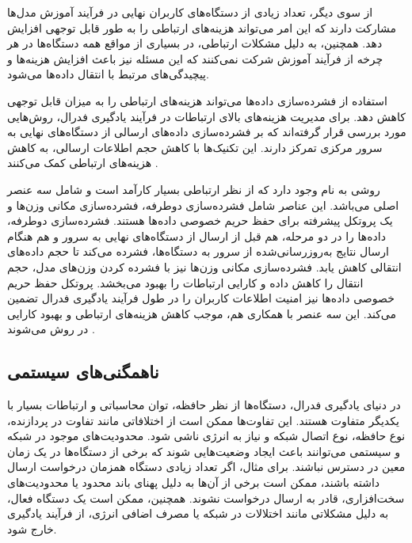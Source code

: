 از سوی دیگر، تعداد زیادی از دستگاه‌های کاربران نهایی در فرآیند آموزش مدل‌ها مشارکت دارند که این امر می‌تواند هزینه‌های ارتباطی را به طور قابل توجهی افزایش دهد. همچنین، به دلیل مشکلات ارتباطی، در بسیاری از مواقع همه دستگاه‌ها در هر چرخه از فرآیند آموزش شرکت نمی‌کنند که این مسئله نیز باعث افزایش هزینه‌ها و پیچیدگی‌های مرتبط با انتقال داده‌ها می‌شود.


استفاده از فشرده‌سازی داده‌ها می‌تواند هزینه‌های ارتباطی را به میزان قابل توجهی کاهش دهد. برای مدیریت هزینه‌های بالای ارتباطات در فرآیند یادگیری فدرال، روش‌هایی مورد بررسی قرار گرفته‌اند که بر فشرده‌سازی داده‌های ارسالی از دستگاه‌های نهایی به سرور مرکزی تمرکز دارند. این تکنیک‌ها با کاهش حجم اطلاعات ارسالی، به کاهش هزینه‌های ارتباطی کمک می‌کنند
\cite{konevcny2016federated}.

روشی به نام
%
وجود دارد که از نظر ارتباطی بسیار کارآمد است و شامل سه عنصر اصلی می‌باشد. این عناصر شامل فشرده‌سازی دوطرفه، فشرده‌سازی مکانی وزن‌ها و یک پروتکل پیشرفته برای حفظ حریم خصوصی داده‌ها هستند. فشرده‌سازی دوطرفه، داده‌ها را در دو مرحله، هم قبل از ارسال از دستگاه‌های نهایی به سرور و هم هنگام ارسال نتایج به‌روزرسانی‌شده از سرور به دستگاه‌ها، فشرده می‌کند تا حجم داده‌های انتقالی کاهش یابد. فشرده‌سازی مکانی وزن‌ها نیز با فشرده کردن وزن‌های مدل، حجم انتقال را کاهش داده و کارایی ارتباطات را بهبود می‌بخشد. پروتکل حفظ حریم خصوصی داده‌ها نیز امنیت اطلاعات کاربران را در طول فرآیند یادگیری فدرال تضمین می‌کند. این سه عنصر با همکاری هم، موجب کاهش هزینه‌های ارتباطی و بهبود کارایی در روش
می‌شوند
\cite{fang2021privacy}.



\subsection{
	ناهمگنی‌های سیستمی%
}
در دنیای یادگیری فدرال، دستگاه‌ها از نظر حافظه، توان محاسباتی و ارتباطات بسیار با یکدیگر متفاوت هستند. این تفاوت‌ها ممکن است از اختلافاتی مانند تفاوت در پردازنده، نوع حافظه، نوع اتصال شبکه و نیاز به انرژی ناشی شود. محدودیت‌های موجود در شبکه و سیستمی می‌توانند باعث ایجاد وضعیت‌هایی شوند که برخی از دستگاه‌ها در یک زمان معین در دسترس نباشند. برای مثال، اگر تعداد زیادی دستگاه همزمان درخواست ارسال داشته باشند، ممکن است برخی از آن‌ها به دلیل پهنای باند محدود یا محدودیت‌های سخت‌افزاری، قادر به ارسال درخواست نشوند. همچنین، ممکن است یک دستگاه فعال، به دلیل مشکلاتی مانند اختلالات در شبکه یا مصرف اضافی انرژی، از فرآیند یادگیری خارج شود.

